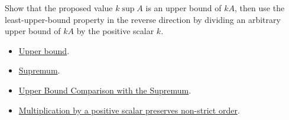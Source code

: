\begin{remark*}
Show that the proposed value $k\sup A$ is an upper bound of $kA$, then use
the least-upper-bound property in the reverse direction by dividing an
arbitrary upper bound of $kA$ by the positive scalar $k$.
\end{remark*}

\begin{dependencies}
\begin{itemize}
  \item \hyperref[def:real-upper-bound]{Upper bound}.
  \item \hyperref[def:supremum]{Supremum}.
  \item \hyperref[prop:upper-bound-comparison-with-the-supremum]{Upper Bound Comparison with the Supremum}.
  \item \hyperref[thm:ineq-nonstrict-multiply-positive]{Multiplication by a positive scalar preserves non-strict order}.
\end{itemize}
\end{dependencies}

\clearpage
